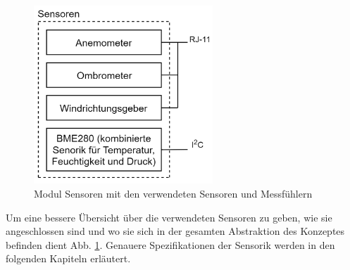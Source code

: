\newpage

\begin{figure}[hbtp]
\centering
\includegraphics[width=0.6\textwidth]{graphics/Konzeptdiagramme/Sensoren.PNG}
\caption{Modul Sensoren mit den verwendeten Sensoren und Messfühlern}
\label{fig:Sensoren}
\end{figure}

Um eine bessere Übersicht über die verwendeten Sensoren zu geben, wie sie angeschlossen sind und wo sie sich in der gesamten Abstraktion des Konzeptes befinden dient Abb. \ref{fig:Sensoren}. Genauere Spezifikationen der Sensorik werden in den folgenden Kapiteln erläutert.

\newpage
